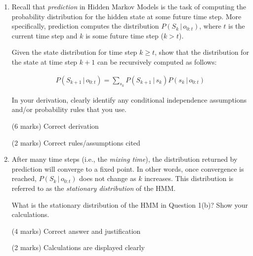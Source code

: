 \documentclass[12pt]{article}
\begin{document}
\begin{enumerate}[font=\Large,label=(\alph*)]
\begin{markscheme}

(10 marks) Correct execution of the Forward Backward Algorithm

(2 marks) \, Calculations are displayed clearly

\end{markscheme}

\item 
Recall that \textit{prediction} in Hidden Markov Models is the task of computing the probability distribution for the hidden state at some future time step. More specifically, prediction computes the distribution $P(S_k\,|\,o_{0:t})$, where $t$ is the current time step and $k$ is some future time step ($k > t$). 

Given the state distribution for time step $k \geq t$, show that the distribution for the state at time step $k + 1$ can be recursively computed as follows:

\begin{align*}
    P(S_{k+1}\,|\,o_{0:t}) = \sum_{s_k} P(S_{k+1}\,|\,s_k) P(s_k\,|\,o_{0:t})
\end{align*}

In your derivation, clearly identify any conditional independence assumptions and/or probability rules that you use.

\begin{markscheme}

(6 marks) Correct derivation

(2 marks) Correct rules/assumptions cited

\end{markscheme}

\item
After many time steps (i.e., the \textit{mixing time}), the distribution returned by prediction will converge to a fixed point. In other words, once convergence is reached, $P(S_{k}\,|\,o_{0:t})$ does not change as $k$ increases. This distribution is referred to as the \textit{stationary distribution} of the HMM.

What is the stationary distribution of the HMM in Question 1(b)? Show your calculations.

\begin{markscheme}

(4 marks) Correct answer and justification

(2 marks) Calculations are displayed clearly

\end{markscheme}


\end{enumerate}
\end{document}
